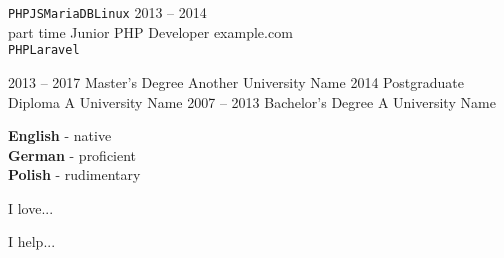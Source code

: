\documentclass[9pt]{developercv} %
\begin{document}
\begin{entrylist}
{  \texttt{PHP}\slashsep\texttt{JS}\slashsep\texttt{MariaDB}\slashsep\texttt{Linux}}
  \entry
  {2013 -- 2014\\\footnotesize{part time}}
  {Junior PHP Developer}
  {example.com}
  {\lorem\lorem\\ \texttt{PHP}\slashsep\texttt{Laravel}}
\end{entrylist}



\begin{entrylist}
  \entry
  {2013 -- 2017}
  {Master's Degree}
  {Another University Name}
  {\lorem\lorem\lorem}
  \entry
  {2014}
  {Postgraduate Diploma}
  {A University Name}
  {\lorem\lorem}
  \entry
  {2007 -- 2013}
  {Bachelor's Degree}
  {A University Name}
  {\lorem\lorem}
\end{entrylist}


\begin{minipage}[t]{0.3\textwidth} %
  \vspace{-\baselineskip} %


  \textbf{English} - native\\
  \textbf{German} - proficient\\
  \textbf{Polish} - rudimentary
\end{minipage}
\hfill %
\begin{minipage}[t]{0.3\textwidth} %
  \vspace{-\baselineskip} %


  I love... \lorem
\end{minipage}
\hfill %
\begin{minipage}[t]{0.3\textwidth} %
  \vspace{-\baselineskip} %


  I help... \lorem
\end{minipage}

\end{document}

